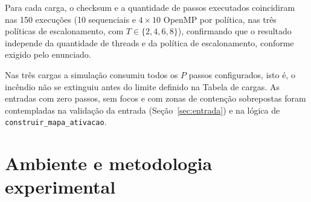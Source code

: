 \documentclass[12pt,a4paper]{article}
\begin{document}
Para cada carga, o checksum e a quantidade de passos executados
coincidiram nas 150 execuções (10 sequenciais e $4\times10$ OpenMP por
política, nas três políticas de escalonamento, com $T\in\{2,4,6,8\}$),
confirmando que o resultado independe da quantidade de threads e da
política de escalonamento, conforme exigido pelo enunciado.

Nas três cargas a simulação consumiu
todos os $P$ passos configurados, isto é, o incêndio não se extinguiu
antes do limite definido na Tabela de cargas. As entradas com zero
passos, sem focos e com zonas de contenção sobrepostas foram
contempladas na validação da entrada (Seção~\ref{sec:entrada}) e na
lógica de \texttt{construir\_mapa\_ativacao}.


\section{Ambiente e metodologia experimental}\label{sec:ambiente}
\end{document}
